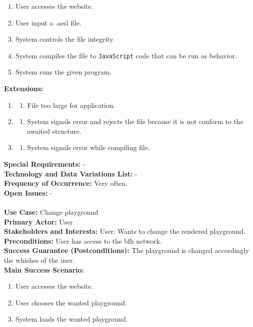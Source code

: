 \documentclass{scrreprt}
\begin{document}
\begin{enumerate}
  \item User accesses the website.
  \item User input a .aesl file.
  \item System controls the file integrity.
  \item System compiles the file to \texttt{JavaScript} code that can be run as behavior.
  \item System runs the given program.
\end{enumerate}
\textbf{Extensions: }
\begin{enumerate}\addtocounter{enumi}{1}
  \item 
  \begin{enumerate}
    \item File too large for application.
  \end{enumerate}
  \item
  \begin{enumerate}
    \item System signals error and rejects the file because it is not conform to the awaited structure.
  \end{enumerate}
  \item 
  \begin{enumerate}
    \item System signals error while compiling file.
  \end{enumerate}
\end{enumerate}
\textbf{Special Requirements: }- \\
\textbf{Technology and Data Variations List: }- \\
\textbf{Frequency of Occurrence: }Very often. \\
\textbf{Open Issues: }- \\
\\
\textbf{Use Case: }Change playground \\
\textbf{Primary Actor: }User \\
\textbf{Stakeholders and Interests: }User: Wants to change the rendered playground. \\
\textbf{Preconditions: }User has access to the bfh network. \\
\textbf{Success Guarantee (Postconditions): }The playground is changed accordingly the whishes of the user. \\
\textbf{Main Success Scenario: }
\begin{enumerate}
  \item User accesses the website.
  \item User chooses the wanted playground.
  \item System loads the wanted playground.
\end{enumerate}
\end{document}
